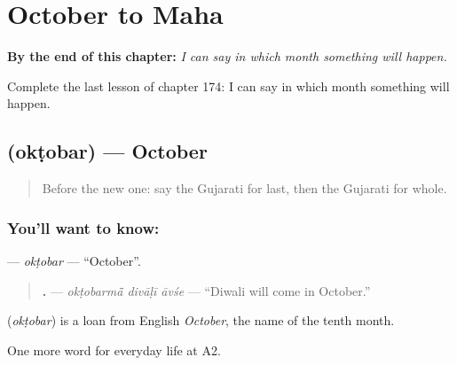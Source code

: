 
\chapter{October to Maha}
\label{ch:gu-october-to-maha}

\begin{chapteropening}
\textbf{By the end of this chapter:} \emph{I can say in which month something will happen.}

Complete the last lesson of chapter 174: I can say in which month something will happen.
\end{chapteropening}

\section[\texorpdfstring{\gu{ઓક્ટોબર} (okṭobar)}{ઓક્ટોબર (okṭobar)}]{ (okṭobar) — October}

\label{lesson:GU-C174-oktobar}



\begin{quote}
Before the new one: say the Gujarati for last, then the Gujarati for whole.
\end{quote}

\subsection*{You'll want to know: }
\textbf{} — \emph{okṭobar} — \textquotedblleft{}October\textquotedblright{}.

\begin{quote}
\textbf{  .} — \emph{okṭobarmā̃ divāḷī āvśe} — \textquotedblleft{}Diwali will come in October.\textquotedblright{}
\end{quote}

\begin{cousinweb}
\textbf{} (\emph{okṭobar}) is a loan from English \emph{October}, the name of the tenth month.
\end{cousinweb}

\begin{grammarlens}[title={What you've built}]
One more word for everyday life at A2.
\end{grammarlens}

